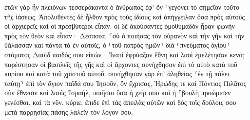 \documentclass{openreader}
\begin{document}
ἐτῶν γὰρ ἦν πλειόνων τεσσεράκοντα ὁ ἄνθρωπος ἐφ’ ὃν ⸀γεγόνει τὸ σημεῖον τοῦτο τῆς ἰάσεως. 
Ἀπολυθέντες δὲ ἦλθον πρὸς τοὺς ἰδίους καὶ ἀπήγγειλαν ὅσα πρὸς αὐτοὺς οἱ ἀρχιερεῖς καὶ οἱ πρεσβύτεροι εἶπαν. 
οἱ δὲ ἀκούσαντες ὁμοθυμαδὸν ἦραν φωνὴν πρὸς τὸν θεὸν καὶ εἶπαν· Δέσποτα, ⸀σὺ ὁ ποιήσας τὸν οὐρανὸν καὶ τὴν γῆν καὶ τὴν θάλασσαν καὶ πάντα τὰ ἐν αὐτοῖς, 
ὁ ⸂τοῦ πατρὸς ἡμῶν⸃ διὰ ⸂πνεύματος ἁγίου⸃ στόματος Δαυὶδ παιδός σου εἰπών· Ἱνατί ἐφρύαξαν ἔθνη καὶ λαοὶ ἐμελέτησαν κενά; 
παρέστησαν οἱ βασιλεῖς τῆς γῆς καὶ οἱ ἄρχοντες συνήχθησαν ἐπὶ τὸ αὐτὸ κατὰ τοῦ κυρίου καὶ κατὰ τοῦ χριστοῦ αὐτοῦ. 
συνήχθησαν γὰρ ἐπ’ ἀληθείας ⸂ἐν τῇ πόλει ταύτῃ⸃ ἐπὶ τὸν ἅγιον παῖδά σου Ἰησοῦν, ὃν ἔχρισας, Ἡρῴδης τε καὶ Πόντιος Πιλᾶτος σὺν ἔθνεσιν καὶ λαοῖς Ἰσραήλ, 
ποιῆσαι ὅσα ἡ χείρ σου καὶ ἡ ⸀βουλὴ προώρισεν γενέσθαι. 
καὶ τὰ νῦν, κύριε, ἔπιδε ἐπὶ τὰς ἀπειλὰς αὐτῶν καὶ δὸς τοῖς δούλοις σου μετὰ παρρησίας πάσης λαλεῖν τὸν λόγον σου, 
\end{document}
